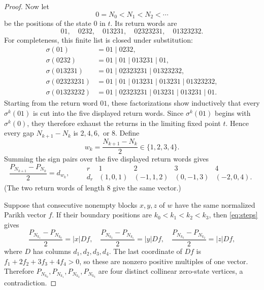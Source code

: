 \documentclass[11pt]{article}
\begin{document}
\begin{proof}
Now let
\[
 0=N_0<N_1<N_2<\cdots
\]
be the positions of the state $0$ in $t$.  Its return words are
\[
 01,\quad0232,\quad013231,\quad02323231,\quad01323232.
\]
For completeness, this finite list is closed under substitution:
\[
\begin{aligned}
 \sigma(01)&=01\mid0232,\\
 \sigma(0232)&=01\mid01\mid013231\mid01,\\
 \sigma(013231)&=01\mid02323231\mid01323232,\\
 \sigma(02323231)&=01\mid01\mid013231\mid013231\mid01323232,\\
 \sigma(01323232)&=01\mid02323231\mid013231\mid013231\mid01.
\end{aligned}
\]
Starting from the return word $01$, these factorizations show inductively that
every $\sigma^k(01)$ is cut into the five displayed return words. Since
$\sigma^k(01)$ begins with $\sigma^k(0)$, they therefore exhaust the returns
in the limiting fixed point $t$. Hence every gap $N_{k+1}-N_k$ is $2,4,6,$ or $8$.  Define
\[
 w_k=\frac{N_{k+1}-N_k}{2}\in\{1,2,3,4\}.
\]
Summing the sign pairs over the five displayed return words gives
\begin{equation}\label{eq:steps}
 \frac{P_{N_{k+1}}-P_{N_k}}2=d_{w_k},
 \qquad
 \begin{array}{c|rrrr}
 r&1&2&3&4\\ \hline
 d_r&(1,0,1)&(-1,1,2)&(0,-1,3)&(-2,0,4).
 \end{array}
\end{equation}
(The two return words of length $8$ give the same vector.)

Suppose that consecutive nonempty blocks $x,y,z$ of $w$ have the same
normalized Parikh vector $f$.  If their boundary positions are
$k_0<k_1<k_2<k_3$, then \eqref{eq:steps} gives
\[
 \frac{P_{N_{k_1}}-P_{N_{k_0}}}{2}=|x|Df,
 \quad
 \frac{P_{N_{k_2}}-P_{N_{k_1}}}{2}=|y|Df,
 \quad
 \frac{P_{N_{k_3}}-P_{N_{k_2}}}{2}=|z|Df,
\]
where $D$ has columns $d_1,d_2,d_3,d_4$.  The last coordinate of $Df$ is
$f_1+2f_2+3f_3+4f_4>0$, so these are nonzero positive multiples of one
vector.  Therefore
$P_{N_{k_0}},P_{N_{k_1}},P_{N_{k_2}},P_{N_{k_3}}$ are four distinct
collinear zero-state vertices, a contradiction.
\end{proof}
\end{document}
